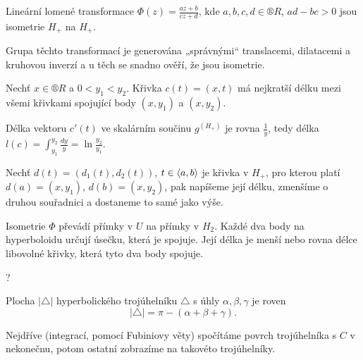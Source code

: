 \documentclass[12pt]{article}                   %
\begin{document}
        \begin{dukazin}
            Lineární lomené transformace $\Phi(z) = \frac{az + b}{cz + d}$, kde $a, b, c, d \in ®R$, $ad - bc > 0$ jsou isometrie $H_+$ na $H_+$.

            \begin{dukazin}
                Grupa těchto transformací je generována „správnými“ translacemi, dilatacemi a kruhovou inverzí a u těch se snadno ověří, že jsou isometrie.
            \end{dukazin}
        \end{dukazin}

        \begin{lemma}
            Nechť $x \in ®R$ a $0 < y_1 < y_2$. Křivka $c(t) = (x, t)$ má nejkratší délku mezi všemi křivkami spojující body $(x, y_1)$ a $(x, y_2)$.
            \begin{dukazin}
                Délka vektoru $c'(t)$ ve skalárním součinu $g^{(H_+)}$ je rovna $\frac{1}{y}$, tedy délka $l(c) = \int_{y_1}^{y_2}\frac{dy}{y} = \ln \frac{y_2}{y_1}$.

                Nechť $d(t) = (d_1(t), d_2(t))$, $t \in \left\langle a, b\right\rangle$ je křivka v $H_+$, pro kterou platí $d(a) = (x, y_1)$, $d(b) = (x, y_2)$, pak napíšeme její délku, zmenšíme o druhou souřadnici a dostaneme to samé jako výše.
            \end{dukazin}
        \end{lemma}

        \begin{veta}
            Isometrie $\Phi$ převádí přímky v $U$ na přímky v $H_2$. Každé dva body na hyperboloidu určují úsečku, která je spojuje. Její délka je menší nebo rovna délce libovolné křivky, která tyto dva body spojuje.

            \begin{dukazin}
                ?
            \end{dukazin}
        \end{veta}

        \begin{veta}
            Plocha $|\triangle|$ hyperbolického trojúhelníku $\triangle$ s úhly $\alpha, \beta, \gamma$ je roven
            $$ |\triangle| = \pi - (\alpha + \beta + \gamma). $$

            \begin{dukazin}
                Nejdříve (integrací, pomocí Fubiniovy věty) spočítáme povrch trojúhelníka s $C$ v nekonečnu, potom ostatní zobrazíme na takovéto trojúhelníky.
            \end{dukazin}
        \end{veta}
\end{document}
